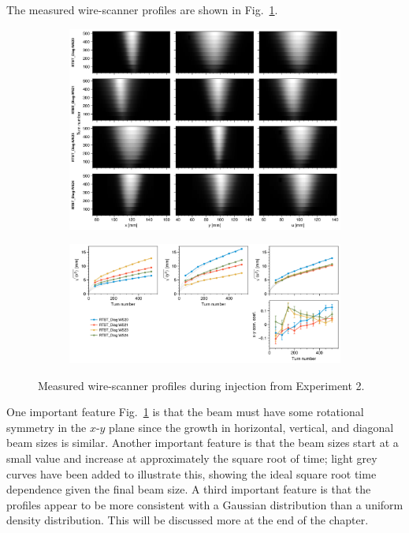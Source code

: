 The measured wire-scanner profiles are shown in Fig.~\ref{fig:exp2_wsmeas}.
%
\begin{figure}[!p]
    \centering
    \begin{subfigure}{\textwidth}
        \includegraphics[width=\textwidth]{Images/chapter5/exp2/waterfall.png}
    \end{subfigure}
    \vfill
    \vspace*{1.25cm}
    \vfill
    \begin{subfigure}{\textwidth}
        \includegraphics[width=\textwidth]{Images/chapter5/exp2/rms.png}
    \end{subfigure}
    \caption{Measured wire-scanner profiles during injection from Experiment 2.}
    \label{fig:exp2_wsmeas}
\end{figure}
%
One important feature Fig.~\ref{fig:exp2_wsmeas} is that the beam must have some rotational symmetry in the $x$-$y$ plane since the growth in horizontal, vertical, and diagonal beam sizes is similar. Another important feature is that the beam sizes start at a small value and increase at approximately the square root of time; light grey curves have been added to illustrate this, showing the ideal square root time dependence given the final beam size. A third important feature is that the profiles appear to be more consistent with a Gaussian distribution than a uniform density distribution. This will be discussed more at the end of the chapter.


